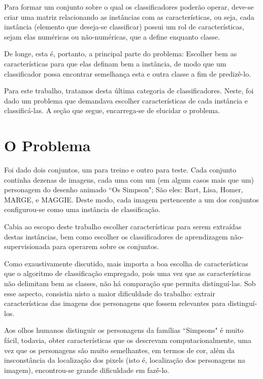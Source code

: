 \documentclass[12pt]{article}
\begin{document}
	Para formar um conjunto sobre o qual os classificadores poderão operar, deve-se criar uma matriz relacionando as instâncias com as características, ou seja, cada instância (elemento que deseja-se classificar) possui um rol de características, sejam elas numéricas ou não-numéricas, que a define enquanto classe.

	De longe, esta é, portanto, a principal parte do problema: Escolher bem as características para que elas definam bem a instância, de modo que um classificador possa encontrar semelhança esta e outra classe a fim de predizê-lo.

	Para este trabalho, tratamos desta última categoria de classificadores. Neste, foi dado um problema que demandava escolher características de cada instância e classificá-las. A seção que segue, encarrega-se de elucidar o problema.

\section{O Problema}\label{sec:problema}

	Foi dado dois conjuntos, um para treino e outro para teste. Cada conjunto continha dezenas de imagens, cada uma com um (em algum casos mais que um) personagem do desenho animado ``Os Simpson"; São eles: Bart, Lisa, Homer, MARGE, e MAGGIE. Deste modo, cada imagem pertencente a um dos conjuntos configurou-se como uma instância de classificação.

	Cabia ao escopo deste trabalho escolher características para serem extraídas destas instâncias, bem como escolher os classificadores de aprendizagem não-supervisionada para operarem sobre os conjuntos.

	Como exaustivamente discutido, mais importa a boa escolha de características que o algoritmo de classificação empregado, pois uma vez que as características não delimitam bem as classes, não há comparação que permita distinguí-las. Sob esse aspecto, consistia nisto a maior dificuldade do trabalho: extrair características das imagens dos personagens que fossem relevantes para distinguí-los.

	Aos olhos humanos distinguir os personagens da famílias ``Simpsons" é muito fácil, todavia, obter características que os descrevam computacionalmente, uma vez que os personagens são muito semelhantes, em termos de cor, além da insconstância da localização dos pixels (isto é, localização dos personagens na imagem), encontrou-se grande dificuldade em fazê-lo.
\end{document}
